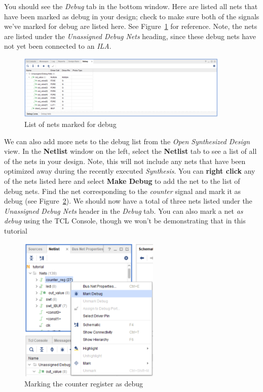 \documentclass[11pt]{article}
\begin{document}
You should see the \textit{Debug} tab in the bottom window. Here are listed all nets that have been marked as debug in your design; check to make sure both of the signals we've marked for debug are listed here. See Figure~\ref{fig:debug_list} for reference. Note, the nets are listed under the \textit{Unassigned Debug Nets} heading, since these debug nets have not yet been connected to an \textit{ILA}.

\begin{figure}[!h]
    \centering
    \includegraphics[width=0.9\textwidth]{images/debug_list.png}
    \caption{List of nets marked for debug}
    \label{fig:debug_list}
\end{figure}

We can also add more nets to the debug list from the \textit{Open Synthesized Design} view. In the \textbf{Netlist} window on the left, select the \textbf{Netlist} tab to see a list of all of the nets in your design. Note, this will not include any nets that have been optimized away during the recently executed \textit{Synthesis}. You can \textbf{right click} any of the nets listed here and select \textbf{Make Debug} to add the net to the list of debug nets. Find the net corresponding to the \textit{counter} signal and mark it as debug (see Figure~\ref{fig:counter_as_debug}). We should now have a total of three nets listed under the \textit{Unassigned Debug Nets} header in the \textit{Debug} tab. You can also mark a net \textit{as debug} using the TCL Console, though we won't be demonstrating that in this tutorial

\begin{figure}[!h]
    \centering
    \includegraphics[width=0.6\textwidth]{images/counter_as_debug.png}
    \caption{Marking the counter register as debug}
    \label{fig:counter_as_debug}
\end{figure}
\end{document}
